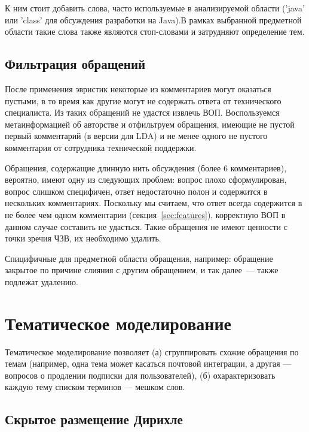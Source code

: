 К ним стоит добавить слова, часто используемые в анализируемой области ('java' или 'class' для обсуждения разработки на Java).В рамках выбранной предметной области такие слова также являются стоп-словами и затрудняют определение тем.

\subsection{Фильтрация обращений}
\label{subsec:ticketfilter}

После применения эвристик некоторые из комментариев могут оказаться пустыми, в то время как другие могут не содержать ответа от технического специалиста. Из таких обращений не удастся извлечь ВОП. Воспользуемся метаинформацией об авторстве и отфильтруем обращения, имеющие не пустой первый комментарий (в версии для LDA) и не менее одного не пустого комментария от сотрудника технической поддержки.

Обращения, содержащие длинную нить обсуждения (более 6 комментариев), вероятно, имеют одну из следующих проблем: вопрос плохо сформулирован, вопрос слишком специфичен, ответ недостаточно полон и содержится в нескольких комментариях. Поскольку мы считаем, что ответ всегда содержится в не более чем одном комментарии (секция~\ref{sec:features}), корректную ВОП в данном случае составить не удасться. Такие обращения не имеют ценности с точки зречия ЧЗВ, их необходимо удалить.

Спицифичные для предметной области обращения, например: обращение закрытое по причине слияния с другим обращением, и так далее~--- также подлежат удалению.

\section{Тематическое моделирование}
\label{sec:topicmodeling}

Тематическое моделирование \cite{TM} позволяет (а) сгруппировать схожие обращения по темам (например, одна тема может касаться почтовой интеграции, а другая --- вопросов о продлении подписки для пользователей), (б) охарактеризовать каждую тему списком терминов --- мешком слов.

\subsection{Скрытое размещение Дирихле}
\label{subsec:lda}

